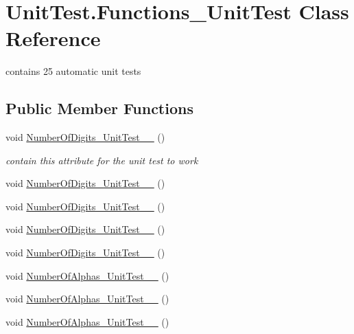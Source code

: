 \hypertarget{class_unit_test_1_1_functions___unit_test}{\section{Unit\+Test.\+Functions\+\_\+\+Unit\+Test Class Reference}
\label{class_unit_test_1_1_functions___unit_test}
}


contains 25 automatic unit tests  


\subsection*{Public Member Functions}
\begin{DoxyCompactItemize}
\item 
void \hyperlink{class_unit_test_1_1_functions___unit_test_ac9667f7017df33e44186ac30b2cfda94}{Number\+Of\+Digits\+\_\+\+Unit\+Test\+\_\+\_} ()
\begin{DoxyCompactList}\small\item\em contain this attribute for the unit test to work \end{DoxyCompactList}\item 
void \hyperlink{class_unit_test_1_1_functions___unit_test_a037bddfef029e67ce27ae898bd5f5782}{Number\+Of\+Digits\+\_\+\+Unit\+Test\+\_\+\_} ()
\item 
void \hyperlink{class_unit_test_1_1_functions___unit_test_ab9cae66c9875b2b9c06683d4d1f67f2a}{Number\+Of\+Digits\+\_\+\+Unit\+Test\+\_\+\_} ()
\item 
void \hyperlink{class_unit_test_1_1_functions___unit_test_adab16964ab2e7c4318879c61040a33a1}{Number\+Of\+Digits\+\_\+\+Unit\+Test\+\_\+\_} ()
\item 
void \hyperlink{class_unit_test_1_1_functions___unit_test_af18bb935e2be6af604e5684528f755fb}{Number\+Of\+Digits\+\_\+\+Unit\+Test\+\_\+\_} ()
\item 
void \hyperlink{class_unit_test_1_1_functions___unit_test_a686cc3819dac9d9362a8240cfa97dd04}{Number\+Of\+Alphas\+\_\+\+Unit\+Test\+\_\+\_} ()
\item 
void \hyperlink{class_unit_test_1_1_functions___unit_test_a038e70a6655ba8ba2994643d86b767f2}{Number\+Of\+Alphas\+\_\+\+Unit\+Test\+\_\+\_} ()
\item 
void \hyperlink{class_unit_test_1_1_functions___unit_test_aaf7ac6a22f493e2352e4cba46f84c054}{Number\+Of\+Alphas\+\_\+\+Unit\+Test\+\_\+\_} ()
\item 

\end{DoxyCompactItemize}

